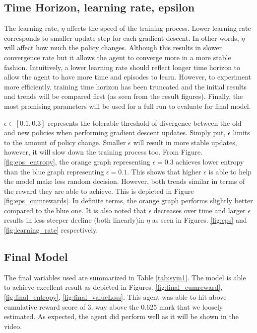 \subsection{Time Horizon, learning rate, epsilon}

The learning rate, $\eta$ affects the speed of the training process. Lower learning rate corresponds to smaller update step for each gradient descent. In other words, $\eta$ will affect how much the policy changes. Although this results in slower convergence rate but it allows the agent to converge more in a more stable fashion. Intuitively, a lower learning rate should reflect longer time horizon to allow the agent to have more time and episodes to learn. However, to experiment more efficiently, training time horizon has been truncated and the initial results and trends will be compared first (as seen from the result figures). Finally, the most promising parameters will be used for a full run to evaluate for final model. 

$\epsilon \in [0.1, 0.3]$ represents the tolerable threshold of divergence between the old and new policies when performing gradient descent updates. Simply put, $\epsilon$ limits to the amount of policy change. Smaller $\epsilon$ will result in more stable updates, however, it will slow down the training process too.  From Figure. \ref{fig:eps_entropy},
the orange graph representing $\epsilon=0.3$ achieves lower entropy than the blue graph representing $\epsilon=0.1$. This shows that higher $\epsilon$ is able to help the model make less random decision. However, both trends similar in terms of the reward they are able to achieve. This is depicted in Figure \ref{fig:eps_cumrewards}. In definite terms, the orange graph performs slightly better compared to the blue one. It is also noted that $\epsilon$ decreases over time and larger $\epsilon$ results in less steeper decline (both linearly)in $\eta$ as seen in Figures. \ref{fig:eps} and \ref{fig:learning_rate} respectively.


\subsection{Final Model}



The final variables used are summarized in Table \ref{tab:sym1}. The model is able to achieve excellent result as depicted in Figures. \ref{fig:final_cumreward}, \ref{fig:final_entropy}, \ref{fig:final_valueLoss}. This agent was able to hit above cumulative reward score of 3, way above the 0.625 mark that we loosely estimated. As expected, the agent did perform well as it will be shown in the video. 

